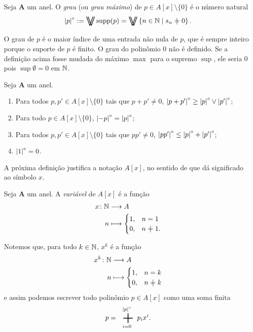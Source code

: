 \begin{definition}
Seja $\bm A$ um anel. O \emph{grau} (ou \emph{grau máximo}) de $p \in A[x] \setminus \{0\}$ é o número natural
	\begin{equation*}
	\grau{p} := \max\supp(p) = \max\set{n \in \N}{s_n \neq 0}.
	\end{equation*}
\end{definition}

O grau de $p$ é o maior índice de uma entrada não nula de $p$, que é sempre inteiro porque o suporte de $p$ é finito. O grau do polinômio $0$ não é definido. Se a definição acima fosse mudada do máximo $\max$ para o supremo $\sup$, ele seria $0$ pois $\sup \emptyset = 0$ em $\mathbb{N}$.

\begin{exercise}
Seja $\bm A$ um anel.
	\begin{enumerate}
	\item Para todos $p,p' \in A[x] \setminus \{0\}$ tais que $p+p'\neq 0$, $\left\vert{p+p'}\right\vert^{\circ} \geq \left\vert{p}\right\vert^{\circ} \mathbin{\vee} \left\vert{p'}\right\vert^{\circ}$;
	\item Para todo $p \in A[x] \setminus \{0\}$, $\left\vert{-p}\right\vert^{\circ} = \left\vert{p}\right\vert^{\circ}$;
	\item Para todos $p,p' \in A[x] \setminus \{0\}$ tais que $pp' \neq 0$, $\left\vert{pp'}\right\vert^{\circ} \leq \left\vert{p}\right\vert^{\circ} + \left\vert{p'}\right\vert^{\circ}$;
	\item $\left\vert{1}\right\vert^{\circ}=0$.
	\end{enumerate}
\end{exercise}

A próxima definição justifica a notação $A[x]$, no sentido de que dá significado ao símbolo $x$.

\begin{definition}
Seja $\bm A$ um anel. A \emph{variável} de $A[x]$ é a função
	\begin{align*}
	\func{x}{\N}{A}{n}{\begin{cases}
		1,& n=1 \\
		0,& n\neq 1.
	\end{cases}}
	\end{align*}
\end{definition}

Notemos que, para todo $k \in \mathbb{N}$, $x^k$ é a função
	\begin{align*}
	\func{x^k}{\N}{A}{n}{\begin{cases}
		1,& n=k \\
		0,& n \neq k
	\end{cases}}
	\end{align*}
e assim podemos escrever todo polinômio $p \in A[x]$ como uma soma finita
	\begin{equation*}
	p = \sum_{i=0}^{\grau{p}} p_ix^i.
	\end{equation*}

